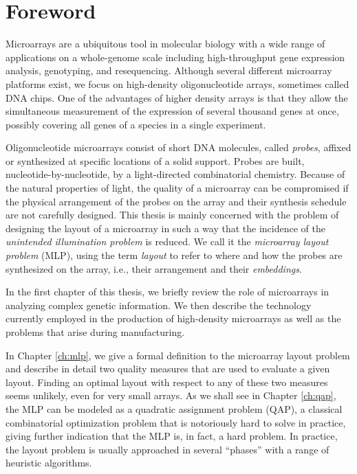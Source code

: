 \chapter*{Foreword}

Microarrays are a ubiquitous tool in molecular biology with a wide range of
applications on a whole-genome scale including high-throughput gene expression
analysis, genotyping, and resequencing. Although several different microarray
platforms exist, we focus on high-density oligonucleotide arrays, sometimes
called DNA chips. One of the advantages of higher density arrays is that they
allow the simultaneous measurement of the expression of several thousand genes
at once, possibly covering all genes of a species in a single experiment.

Oligonucleotide microarrays consist of short DNA molecules, called
\emph{probes}, affixed or synthesized at specific locations of a solid support.
Probes are built, nucleotide-by-nucleotide, by a light-directed combinatorial
chemistry. Because of the natural properties of light, the quality of a
microarray can be compromised if the physical arrangement of the probes on the
array and their synthesis schedule are not carefully designed. This thesis is
mainly concerned with the problem of designing the layout of a microarray in
such a way that the incidence of the \emph{unintended illumination problem} is
reduced. We call it the \emph{microarray layout problem} (MLP), using the term
\emph{layout} to refer to where and how the probes are synthesized on the array,
i.e., their arrangement and their \emph{embeddings}.

In the first chapter of this thesis, we briefly review the role of microarrays
in analyzing complex genetic information. We then describe the technology
currently employed in the production of high-density microarrays as well as the
problems that arise during manufacturing.

In Chapter \ref{ch:mlp}, we give a
formal definition to the microarray layout problem and describe in detail two
quality measures that are used to evaluate a given layout. Finding an optimal
layout with respect to any of these two measures seems unlikely, even for very
small arrays. As we shall see in Chapter \ref{ch:qap}, the MLP can be modeled as
a quadratic assignment problem (QAP), a classical combinatorial optimization
problem that is notoriously hard to solve in practice, giving further
indication that the MLP is, in fact, a hard problem. In practice, the layout
problem is usually approached in several ``phases'' with a range of heuristic
algorithms.

